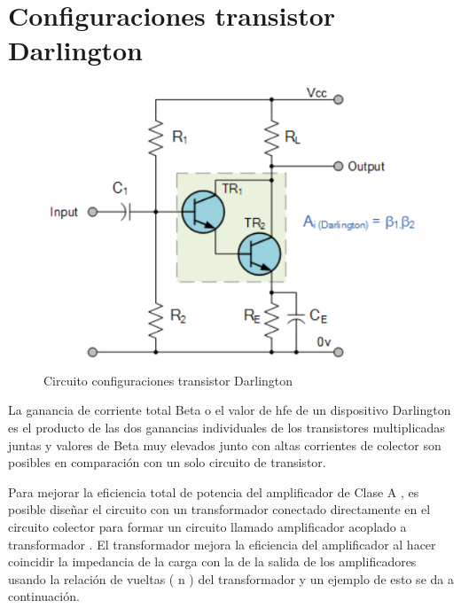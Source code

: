 \documentclass[12pt,a4paper]{article}
\begin{document}
\section*{Configuraciones transistor Darlington}
\begin{figure}[hbtp]
\centering
\includegraphics[scale=0.7]{Circuitos/6.png}
\caption{Circuito configuraciones transistor Darlington}
\end{figure}
La ganancia de corriente total Beta o el valor de hfe de un dispositivo Darlington es el producto de las dos ganancias individuales de los transistores multiplicadas juntas y valores de Beta muy elevados junto con altas corrientes de colector son posibles en comparación con un solo circuito de transistor.

Para mejorar la eficiencia total de potencia del amplificador de Clase A , es posible diseñar el circuito con un transformador conectado directamente en el circuito colector para formar un circuito llamado amplificador acoplado a transformador . El transformador mejora la eficiencia del amplificador al hacer coincidir la impedancia de la carga con la de la salida de los amplificadores usando la relación de vueltas ( n ) del transformador y un ejemplo de esto se da a continuación.
\end{document}
